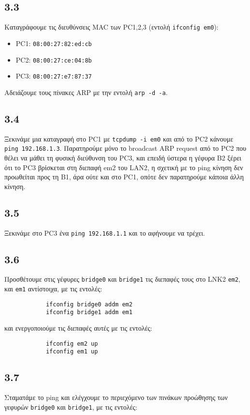 \documentclass[a4paper, 12pt]{article}
\begin{document}
	\subsection*{3.3}
		Καταγράφουμε τις διευθύνσεις MAC των PC1,2,3 (εντολή \verb|ifconfig em0|):
		
		\begin{itemize}
			\item PC1: \verb|08:00:27:82:ed:cb|
			\item PC2: \verb|08:00:27:ce:04:8b|
			\item PC3: \verb|08:00:27:e7:87:37|
		\end{itemize}
		
		Αδειάζουμε τους πίνακες ARP με την εντολή \verb|arp -d -a|.

	\subsection*{3.4}
		Ξεκινάμε μια καταγραφή στο PC1 με \verb|tcpdump -i em0| και από το PC2 κάνουμε \verb|ping 192.168.1.3|. Παρατηρούμε μόνο το broadcast ARP request από το PC2 που θέλει να μάθει τη φυσική διεύθυνση του PC3, και επειδή ύστερα η γέφυρα B2 ξέρει ότι το PC3 βρίσκεται στη διεπαφή em2 του LAN2, η σχετική με το ping κίνηση δεν προωθείται προς τη B1, άρα ούτε και στο PC1, οπότε δεν παρατηρούμε κάποια άλλη κίνηση.

	\subsection*{3.5}
		Ξεκινάμε στο PC3 ένα \verb|ping 192.168.1.1| και το αφήνουμε να τρέχει.

	\subsection*{3.6}
		Προσθέτουμε στις γέφυρες \verb|bridge0| και \verb|bridge1| τις διεπαφές τους στο LNK2 \verb|em2|, και \verb|em1| αντίστοιχα, με τις εντολές:
		
		\begin{verbatim}
			ifconfig bridge0 addm em2
			ifconfig bridge1 addm em1
		\end{verbatim}
		
		και ενεργοποιούμε τις διεπαφές αυτές με τις εντολές:
		
		\begin{verbatim}
			ifconfig em2 up
			ifconfig em1 up
		\end{verbatim}

	\subsection*{3.7}
		Σταματάμε το ping και ελέγχουμε το περιεχόμενο των πινάκων προώθησης των γεφυρών \verb|bridge0| και \verb|bridge1|, με τις εντολές:
		
\end{document}
